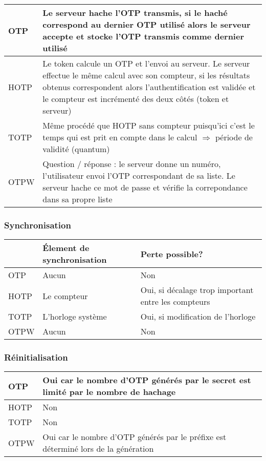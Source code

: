 	\begin{tabular}{| p{3cm} | p{12cm} |}
		\hline
		OTP & Le serveur hache l'OTP transmis, si le haché correspond au
		dernier OTP utilisé alors le serveur accepte et stocke l'OTP transmis
		comme dernier utilisé \\
		\hline
		HOTP & Le token calcule un OTP et l'envoi au serveur. Le serveur
		effectue le même calcul avec son compteur, si les résultats obtenus
		correspondent alors l'authentification est validée et le compteur est
		incrémenté des deux côtés (token et serveur) \\
		\hline
		TOTP & Même procédé que HOTP sans compteur puisqu'ici c'est le temps
		qui est prit en compte dans le calcul $\Rightarrow$ période de
		validité (quantum) \\
		\hline
		OTPW & Question / réponse : le serveur donne un numéro, l'utilisateur
		envoi l'OTP correspondant de sa liste. Le serveur hache ce mot de
		passe et vérifie la correpondance dans sa propre liste\\
		\hline
	\end{tabular}

\subsubsection{Synchronisation}

	\begin{tabular}{| p{3cm} | p{5cm} | p{7cm} |}
		\hline
		& \cellcolor{gray} Élement de synchronisation & \cellcolor{gray} Perte
		possible? \\
		\hline
		OTP & Aucun & Non \\
		\hline
		HOTP & Le compteur & Oui, si décalage trop important entre les
		compteurs \\
		\hline
		TOTP & L'horloge système & Oui, si modification de l'horloge \\
		\hline
		OTPW & Aucun & Non \\
		\hline
	\end{tabular}

\subsubsection{Réinitialisation}

	\begin{tabular}{| p{3cm} | p{12cm} |}
		\hline
		OTP & Oui car le nombre d'OTP générés par le secret est limité par le
		nombre de hachage \\
		\hline
		HOTP & Non \\
		\hline
		TOTP & Non \\
		\hline
		OTPW & Oui car le nombre d'OTP générés par le préfixe est déterminé
		lors de la génération \\
		\hline
	\end{tabular}

